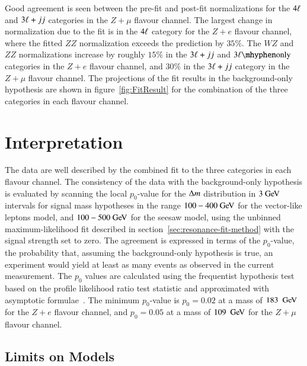 Good agreement is seen between the pre-fit and post-fit normalizations for the $4\ell$ and $3\ell+jj$ categories in the $Z+\mu$ flavour channel. The largest change in normalization due to the fit is in the $4\ell$ category for the $Z+e$ flavour channel, where the fitted $ZZ$ normalization exceeds the prediction by $35\%$. The $WZ$ and $ZZ$ normalizations increase by roughly $15\%$ in the $3\ell+jj$ and $\threelo$ categories in the $Z+e$ flavour channel, and $30\%$ in the $3\ell+jj$ category in the $Z+\mu$ flavour channel. The projections of the fit results in the background-only hypothesis are shown in figure~\ref{fig:FitResult} for the combination of the three categories in each flavour channel.




\section{Interpretation}\label{sec:resonance-interpretation}
The data are well described by the combined fit to the three categories in each flavour channel. The consistency of the data with the background-only hypothesis is evaluated by scanning the local $p_0$-value for the $\Delta m$ distribution in $3 \GeV$ intervals for signal mass hypotheses in the range $100-400 \GeV$ for the vector-like leptons model, and $100-500 \GeV$ for the seesaw model, using the unbinned maximum-likelihood fit described in section~\ref{sec:resonance-fit-method} with the signal strength set to zero. The agreement is expressed in terms of the $p_0$-value, the probability that, assuming the background-only hypothesis is true, an experiment would yield at least as many events as observed in the current measurement. The $p_0$ values are calculated using the frequentist hypothesis test based on the profile likelihood ratio test statistic and approximated with asymptotic formulae~\cite{asimov}. The minimum $p_0$-value is $p_0=0.02$ at a mass of $183~\GeV$ for the $Z+e$ flavour channel, and $p_0=0.05$ at a mass of $109~\GeV$ for the $Z+\mu$ flavour channel.

\subsection{Limits on Models}

